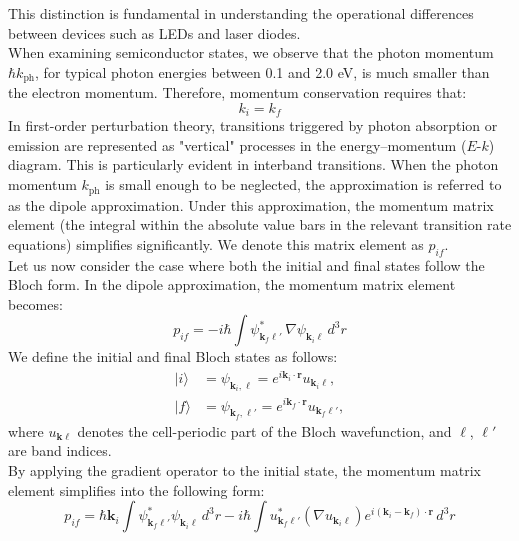 This distinction is fundamental in understanding the operational differences between devices such as LEDs and laser diodes.\\
When examining semiconductor states, we observe that the photon momentum \(\hbar k_{\text{ph}}\), for typical photon energies between 0.1 and 2.0 eV, is much smaller than the electron momentum. Therefore, momentum conservation requires that:
\begin{equation}
	k_i = k_f
\end{equation}
In first-order perturbation theory, transitions triggered by photon absorption or emission are represented as "vertical" processes in the energy–momentum (\(E\)-\(k\)) diagram. This is particularly evident in interband transitions. When the photon momentum \(k_{\text{ph}}\) is small enough to be neglected, the approximation is referred to as the dipole approximation. Under this approximation, the momentum matrix element (the integral within the absolute value bars in the relevant transition rate equations) simplifies significantly. We denote this matrix element as \(p_{if}\).\\
Let us now consider the case where both the initial and final states follow the Bloch form. In the dipole approximation, the momentum matrix element becomes:
\begin{equation}
	p_{if} = -i\hbar \int \psi^*_{\mathbf{k}_f \ell'} \, \nabla \psi_{\mathbf{k}_i \ell} \, d^3 r
\end{equation}
We define the initial and final Bloch states as follows:
\[
	\begin{aligned}
		|i\rangle & = \psi_{\mathbf{k}_i, \ell} = e^{i \mathbf{k}_i \cdot \mathbf{r}} u_{\mathbf{k}_i \ell},   \\
		|f\rangle & = \psi_{\mathbf{k}_f, \ell'} = e^{i \mathbf{k}_f \cdot \mathbf{r}} u_{\mathbf{k}_f \ell'},
	\end{aligned}
\]
where \( u_{\mathbf{k} \ell} \) denotes the cell-periodic part of the Bloch wavefunction, and \(\ell\), \(\ell'\) are band indices.\\
By applying the gradient operator to the initial state, the momentum matrix element simplifies into the following form:
\begin{equation}
	p_{if} = \hbar \mathbf{k}_i \int \psi^*_{\mathbf{k}_f \ell'} \psi_{\mathbf{k}_i \ell} \, d^3 r
	- i\hbar \int u^*_{\mathbf{k}_f \ell'} \left( \nabla u_{\mathbf{k}_i \ell} \right)
	e^{i(\mathbf{k}_i - \mathbf{k}_f) \cdot \mathbf{r}} \, d^3 r
\end{equation}
